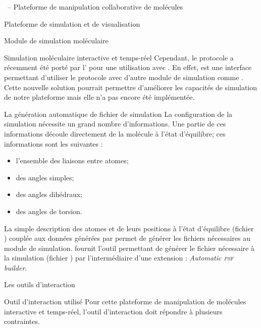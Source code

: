 \documentclass[myfrancais,ngerman,english,french]{mythesis}
\begin{document}
\begin{mychapter}{\myShaddock\ -- Plateforme de manipulation collaborative de molécules}
\begin{mysection}{Plateforme de simulation et de visualisation}
\begin{mysubsection}{Module de simulation moléculaire}
\begin{mysubsubsection}{Simulation moléculaire interactive et temps-réel}
					Cependant, le protocole  a récemment été porté par l' pour une utilisation avec \myGromacs.
					En effet, \myMDDriver {} est une interface permettant d'utiliser le protocole  avec d'autre module de simulation comme \myGromacs.
					Cette nouvelle solution pourrait permettre d'améliorer les capacités de simulation de notre plateforme mais elle n'a pas encore été implémentée.
				\end{mysubsubsection}
				\begin{mysubsubsection}{La génération automatique de fichier de simulation}
					La configuration de la simulation nécessite un grand nombre d'informations.
					Une partie de ces informations découle directement de la molécule à l'état d'équilibre; ces informations sont les suivantes :
					\begin{itemize}
						\item l'ensemble des liaisons entre atomes;
						\item des angles simples;
						\item des angles dihédraux;
						\item des angles de torsion.
					\end{itemize}
					La simple description des atomes et de leurs positions à l'état d'équilibre (fichier \myPDB) couplée aux données générées par \myCHARMM {} permet de générer les fichiers nécessaires au module de simulation.
					 fournit l'outil permettant de générer le fichier nécessaire à la simulation (fichier \myPSF) par l'intermédiaire d'une extension : \textit{Automatic \textsc{psf} builder}.
				\end{mysubsubsection}
			\end{mysubsection}
		\end{mysection}
		\begin{mysection}{Les outils d'interaction}
			\begin{mysubsection}{Outil d'interaction utilisé}
				Pour cette plateforme de manipulation de molécules interactive et temps-réel, l'outil d'interaction doit répondre à plusieurs contraintes.


\end{mysubsection}
\end{mysection}
\end{mychapter}
\end{document}

